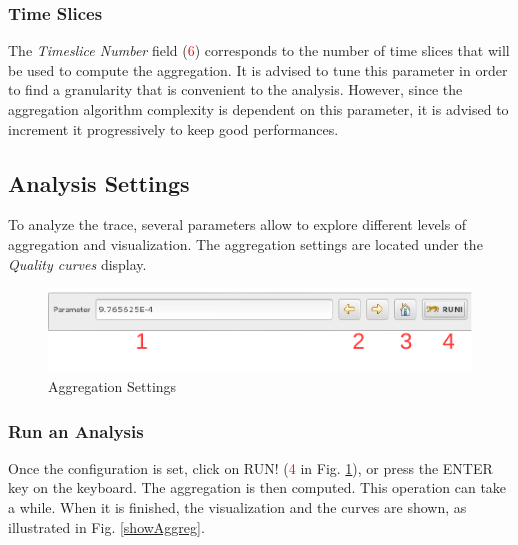 \documentclass[twoside]{article}
\begin{document}
\begin{sloppypar}
\subsubsection{Time Slices}
The \textit{Timeslice Number} field (\textcolor{red}{6}) corresponds to the number of time slices that will be used to compute the aggregation. It is advised to tune this parameter in order to find a granularity that is convenient to the analysis. However, since the aggregation algorithm complexity is dependent on this parameter, it is advised to increment it progressively to keep good performances.

\subsection{Analysis Settings}
To analyze the trace, several parameters allow to explore different levels of aggregation and visualization. The aggregation settings are located under the \textit{Quality curves} display.
 
\begin{figure}[h!]
	\centering
	\includegraphics[scale=1.0]{images/aggregationSettings.pdf}
	\caption{Aggregation Settings}
	\label{aggregSettings}
\end{figure}

\subsubsection{Run an Analysis}
Once the configuration is set, click on RUN! (\textcolor{red}{4} in Fig. \ref{aggregSettings}), or press the ENTER key on the keyboard. The aggregation is then computed. This operation can take a while. When it is finished, the visualization and the curves are shown, as illustrated in Fig. \ref{showAggreg}.


\end{sloppypar}
\end{document}
